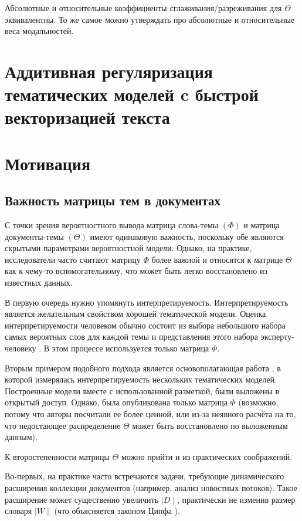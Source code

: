 Абсолютные и относительные коэффициенты сглаживания/разреживания для $\Theta$ эквивалентны. То же самое можно утверждать про абсолютные и относительные веса модальностей. 

\section{Аддитивная регуляризация тематических моделей c
быстрой векторизацией текста}

\section{Мотивация}

\subsection{Важность матрицы тем в документах}
С точки зрения вероятностного вывода матрица слова-темы $(\Phi)$ и матрица документы-темы $(\Theta)$ имеют одинаковую важность, поскольку обе являются скрытыми параметрами вероятностной модели. Однако, на практике, исследователи часто считают матрицу $\Phi$ более важной и относятся к матрице $\Theta$ как к чему-то вспомогательному, что может быть легко восстановлено из известных данных.

В первую очередь нужно упомянуть интерпретируемость. Интерпретируемость является желательным свойством хорошей тематической модели. Оценка интерпретируемости человеком обычно состоит из выбора небольшого набора самых вероятных слов для каждой темы и представления этого набора эксперту-человеку \cite{roder2015exploring}. В этом процессе используется только матрица $\Phi$.

Вторым примером подобного подхода является основополагающая работа \cite{rtl}, в которой измерялась интерпретируемость нескольких тематических моделей. Построенные модели вместе с использованной разметкой, были выложены в открытый доступ. Однако, была опубликована только матрица $\Phi $ (возможно, потому что авторы посчитали ее более ценной, или из-за неявного расчёта на то, что недостающее распределение $\Theta$ может быть восстановлено по выложенным данным).

К второстепенности матрицы $\Theta$ можно прийти и из практических соображений.

Во-первых, на практике часто встречаются задачи, требующие динамического расширения коллекции документов (например, анализ новостных потоков). Такое расширение может существенно увеличить $\mid D\mid$, практически не изменив размер словаря $\mid W \mid$ (что объясняется законом Ципфа ).

